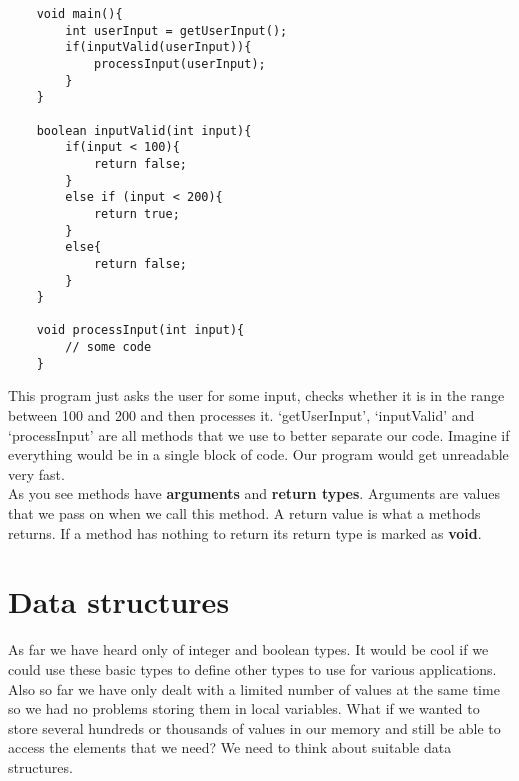 \documentclass{scrreprt}
\begin{document}
\begin{lstlisting}
	void main(){
		int userInput = getUserInput();
		if(inputValid(userInput)){
			processInput(userInput);
		}
	}

	boolean inputValid(int input){
		if(input < 100){
			return false;
		}
		else if (input < 200){
			return true;
		}
		else{
			return false;
		}
	}

	void processInput(int input){
		// some code
	}
\end{lstlisting}
This program just asks the user for some input, checks whether it is in the range between 100 and 200 and then processes it. `getUserInput', `inputValid' and `processInput' are all methods that we use to better separate our code. Imagine if everything would be in a single block of code. Our program would get unreadable very fast. \\
As you see methods have \textbf{arguments} and \textbf{return types}. Arguments are values that we pass on when we call this method. A return value is what a methods returns.
If a method has nothing to return its return type is marked as \textbf{void}.



\section{Data structures}
As far we have heard only of integer and boolean types. It would be cool if we could use these basic types to define other types to use for various applications. Also so far we have only dealt with a limited number of values at the same time so we had no problems storing them in local variables. What if we wanted to store several hundreds or thousands of values in our memory and still be able to access the elements that we need? We need to think about suitable data structures.
\end{document}

